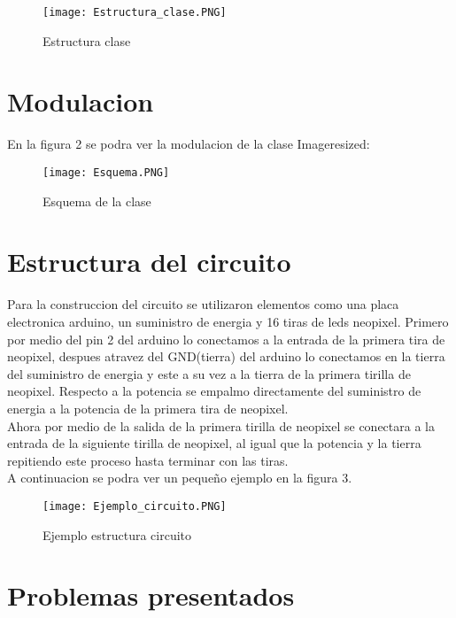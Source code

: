 \documentclass{article}
\begin{document}
\begin{figure}[h]
\texttt{[image: Estructura\_clase.PNG]}
\centering
\caption{Estructura clase}
\label{fig:Estructura_clase}
\end{figure}


\section{Modulacion}\label{contenido}

En la figura 2 se podra ver la modulacion de la clase Imageresized:

\begin{figure}[h]
\texttt{[image: Esquema.PNG]}
\centering
\caption{Esquema de la clase}
\label{fig:Esquema}
\end{figure}

\section{Estructura del circuito}\label{contenido}

Para la construccion del circuito se utilizaron elementos como una placa electronica arduino, un suministro de energia y 16 tiras de leds neopixel. Primero por medio del pin 2 del arduino lo conectamos a la entrada de la primera tira de neopixel, despues atravez del GND(tierra) del arduino lo conectamos en la tierra del suministro de energia y este a su vez a la tierra de la primera tirilla de neopixel. Respecto a la potencia se empalmo directamente del suministro de energia a la potencia de la primera tira de neopixel.\\

Ahora por medio de la salida de la primera tirilla de neopixel se conectara a la entrada de la siguiente tirilla de neopixel, al igual que la potencia y la tierra repitiendo este proceso hasta terminar con las tiras.\\

A continuacion se podra ver un pequeño ejemplo en la figura 3.\\


\begin{figure}[h]
\texttt{[image: Ejemplo\_circuito.PNG]}
\centering
\caption{Ejemplo estructura circuito}
\label{fig:Ejemplo_circuito}
\end{figure}


\section{Problemas presentados}\label{contenido}
\end{document}
